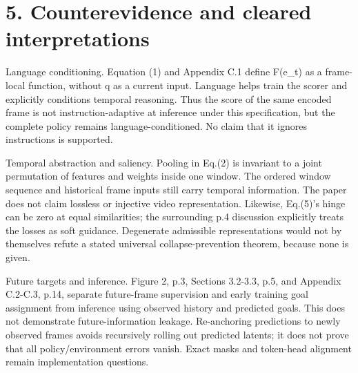 \documentclass[10pt]{article}
\begin{document}
\section*{5. Counterevidence and cleared interpretations}
Language conditioning. Equation (1) and Appendix C.1 define F(e\_t) as a frame-local function, without q as a current input. Language helps train the scorer and explicitly conditions temporal reasoning. Thus the score of the same encoded frame is not instruction-adaptive at inference under this specification, but the complete policy remains language-conditioned. No claim that it ignores instructions is supported.\par
Temporal abstraction and saliency. Pooling in Eq.(2) is invariant to a joint permutation of features and weights inside one window. The ordered window sequence and historical frame inputs still carry temporal information. The paper does not claim lossless or injective video representation. Likewise, Eq.(5)’s hinge can be zero at equal similarities; the surrounding p.4 discussion explicitly treats the losses as soft guidance. Degenerate admissible representations would not by themselves refute a stated universal collapse-prevention theorem, because none is given.\par
Future targets and inference. Figure 2, p.3, Sections 3.2-3.3, p.5, and Appendix C.2-C.3, p.14, separate future-frame supervision and early training goal assignment from inference using observed history and predicted goals. This does not demonstrate future-information leakage. Re-anchoring predictions to newly observed frames avoids recursively rolling out predicted latents; it does not prove that all policy/environment errors vanish. Exact masks and token-head alignment remain implementation questions.\par
\end{document}

